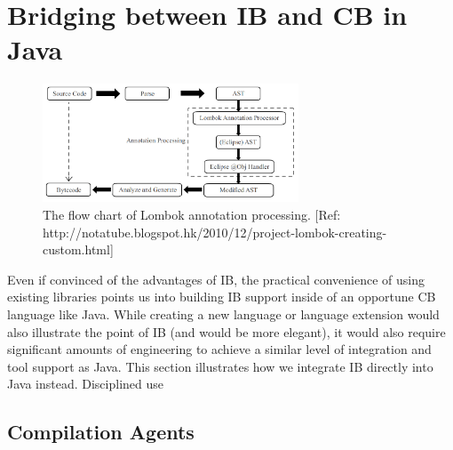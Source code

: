 \section{Bridging between IB and CB in Java}

\begin{figure}[t]\label{fig:lombok}
\centering
\includegraphics[width=3in]{pdfs/lombok.png}
\caption{The flow chart of Lombok annotation processing. [Ref: http://notatube.blogspot.hk/2010/12/project-lombok-creating-custom.html]
}
\end{figure}


Even if convinced of the advantages of IB, the practical convenience
of using existing libraries points us into building IB support inside
of an opportune CB language like Java.
While creating a new language or language extension would also
illustrate the point of IB (and would be more elegant), it would also
require significant amounts of engineering to achieve a similar level
of integration and tool support as Java.
This section illustrates how we integrate IB directly into Java instead. 
Disciplined use  

\subsection{Compilation Agents}

